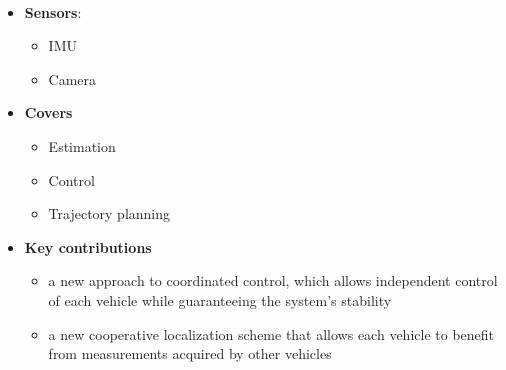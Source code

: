 \documentclass{article}
\begin{document}
		\paragraph{\cite{loianno-2017-cooperative-transportation-using-small-quadrotors-using-monocular-vision-and-inertial-sensing}}
			\begin{itemize}
				\item \textbf{Sensors}: 
					\begin{itemize}
						\item IMU
						\item Camera
					\end{itemize}
				\item \textbf{Covers}
					\begin{itemize}
						\item Estimation
						\item Control
						\item Trajectory planning
					\end{itemize}
				\item \textbf{Key contributions}
					\begin{itemize}
						\item a new approach to coordinated control, which allows independent control of each vehicle while guaranteeing the system’s stability
						\item a new cooperative localization scheme that allows each vehicle to benefit from measurements acquired by other vehicles
					\end{itemize}
			\end{itemize}
\end{document}
